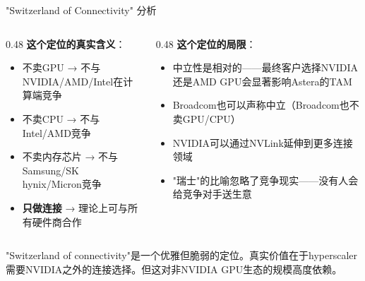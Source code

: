 \documentclass[UTF8,11pt,aspectratio=169]{beamer}
\begin{document}

\begin{frame}{"Switzerland of Connectivity" 分析}
    \begin{columns}[T]
        \begin{column}{0.48\textwidth}
            \textbf{这个定位的真实含义}：
            \begin{itemize}
                \item 不卖GPU → 不与NVIDIA/AMD/Intel在计算端竞争
                \item 不卖CPU → 不与Intel/AMD竞争
                \item 不卖内存芯片 → 不与Samsung/SK hynix/Micron竞争
                \item \textbf{只做连接} → 理论上可与所有硬件商合作
            \end{itemize}
        \end{column}
        \begin{column}{0.48\textwidth}
            \textbf{这个定位的局限}：
            \begin{itemize}
                \item 中立性是\alert{相对的}——最终客户选择NVIDIA还是AMD GPU会显著影响Astera的TAM
                \item Broadcom也可以声称中立（Broadcom也不卖GPU/CPU）
                \item NVIDIA可以通过NVLink延伸到更多连接领域
                \item "瑞士"的比喻忽略了竞争现实——没有人会给竞争对手送生意
            \end{itemize}
        \end{column}
    \end{columns}

    \begin{keypoint}
        "Switzerland of connectivity"是一个\alert{优雅但脆弱}的定位。真实价值在于hyperscaler需要NVIDIA之外的连接选择。但这对非NVIDIA GPU生态的规模高度依赖。
    \end{keypoint}
\end{frame}
\end{document}
